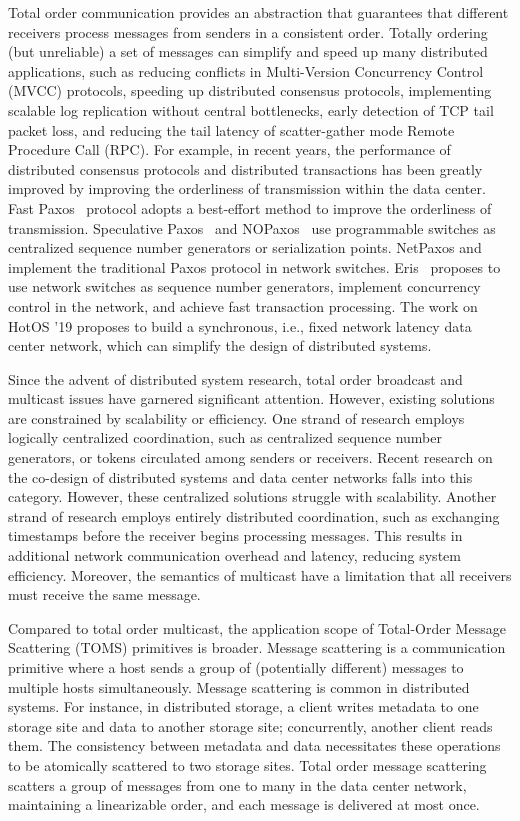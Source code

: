 Total order communication provides an abstraction that guarantees that different receivers process messages from senders in a consistent order. Totally ordering (but unreliable) a set of messages can simplify and speed up many distributed applications, such as reducing conflicts in Multi-Version Concurrency Control (MVCC) protocols, speeding up distributed consensus protocols, implementing scalable log replication without central bottlenecks, early detection of TCP tail packet loss, and reducing the tail latency of scatter-gather mode Remote Procedure Call (RPC). For example, in recent years, the performance of distributed consensus protocols and distributed transactions has been greatly improved by improving the orderliness of transmission within the data center. Fast Paxos~\cite{lamport2006fast,kemme1999processing,moraru2013there,pedone1998optimistic} protocol adopts a best-effort method to improve the orderliness of transmission. Speculative Paxos~\cite{ports2015designing} and NOPaxos~\cite{li2016just} use programmable switches as centralized sequence number generators or serialization points. NetPaxos \cite{dang2015netpaxos,dang2016paxos} and \cite{dang2016network} implement the traditional Paxos protocol in network switches. Eris~\cite{eris} proposes to use network switches as sequence number generators, implement concurrency control in the network, and achieve fast transaction processing. The work on HotOS '19 \cite{synchronous-datacenter} proposes to build a synchronous, i.e., fixed network latency data center network, which can simplify the design of distributed systems.

Since the advent of distributed system research, total order broadcast and multicast issues have garnered significant attention. However, existing solutions are constrained by scalability or efficiency. One strand of research employs logically centralized coordination, such as centralized sequence number generators, or tokens circulated among senders or receivers. Recent research on the co-design of distributed systems and data center networks falls into this category. However, these centralized solutions struggle with scalability. Another strand of research employs entirely distributed coordination, such as exchanging timestamps before the receiver begins processing messages. This results in additional network communication overhead and latency, reducing system efficiency. Moreover, the semantics of multicast have a limitation that all receivers must receive the same message.

Compared to total order multicast, the application scope of Total-Order Message Scattering (TOMS) primitives is broader. Message scattering is a communication primitive where a host sends a group of (potentially different) messages to multiple hosts simultaneously. Message scattering is common in distributed systems. For instance, in distributed storage, a client writes metadata to one storage site and data to another storage site; concurrently, another client reads them. The consistency between metadata and data necessitates these operations to be atomically scattered to two storage sites. Total order message scattering scatters a group of messages from one to many in the data center network, maintaining a linearizable order, and each message is delivered at most once.

